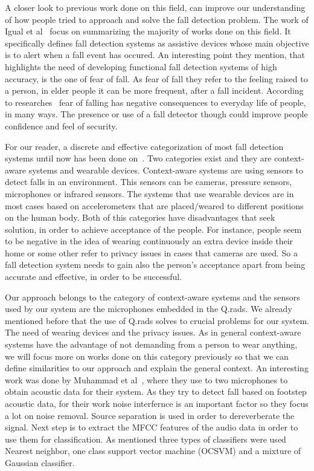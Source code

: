 \documentclass[10pt, conference, compsocconf]{IEEEtran}
\begin{document}
A closer look to previous work done on this field, can improve our understanding of how people tried to approach and solve the fall detection problem. The work of Igual et al~\cite{Igual2013} focus on summarizing the majority of works done on this field. It specifically defines fall detection systems as assistive devices whose main objective is to alert when a fall event has occured. An interesting point they mention, that highlights the need of developing functional fall detection systems of high accuracy, is the one of fear of fall. As fear of fall they refer to the feeling raised to a person, in elder people it can be more frequent, after a fall incident. According to researches~\cite{FearofFalling} fear of falling has negative consequences to everyday life of people, in many ways. The presence or use of a fall detector though could improve people confidence and feel of security. 

For our reader, a discrete and effective categorization of most fall detection systems until now has been done on~\cite{Igual2013}. Two categories exist and they are context-aware systems and wearable devices. Context-aware systems are using sensors to detect falls in an environment. This sensors can be cameras, pressure sensors, microphones or infrared sensors. The systems that use wearable devices are in most cases based on accelerometers that are placed/weared to different positions on the human body. Both of this categories have disadvantages that seek solution, in order to achieve acceptance of the people. For instance, people seem to be negative in the idea of wearing continuously an extra device inside their home or some other refer to privacy issues in cases that cameras are used. So a fall detection system needs to gain also the person's acceptance apart from being accurate and effective, in order to be successful. 

Our approach belongs to the category of context-aware systems and the sensors used by our system are the microphones embedded in the Q.rads. We already mentioned before that the use of Q.rads solves to crucial problems for our system. The need of wearing devices and the privacy issues. As in general context-aware systems have the advantage of not demanding from a person to wear anything, we will focus more on works done on this category previously so that we can define similarities to our approach and explain the general context. An interesting work was done by Muhammad et al~\cite{Muhammad2014}, where they use to two microphones to obtain acoustic data for their system. As they try to detect fall based on footstep acoustic data, for their work noise interfernce is an important factor so they focus a lot on noise removal. Source separation is used in order to dereverberate the signal. Next step is to extract the MFCC features of the audio data in order to use them for classification. As mentioned three types of classifiers were used Nearest neighbor, one class support vector machine (OCSVM) and a mixture of Gaussian classifier. 
\end{document}

